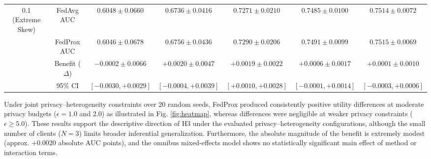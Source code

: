\documentclass[conference]{IEEEtran}
\begin{document}
\begin{table}[t]
\begin{tabular}{ccccccc}
\midrule
0.1 (Extreme Skew)& FedAvg AUC & $0.6048 \pm 0.0660$ & $0.6736 \pm 0.0416$ & $0.7271 \pm 0.0210$ & $0.7485 \pm 0.0100$ & $0.7514 \pm 0.0072$ \\
                & FedProx AUC & $0.6046 \pm 0.0678$ & $0.6756 \pm 0.0436$ & $0.7290 \pm 0.0206$ & $0.7491 \pm 0.0099$ & $0.7515 \pm 0.0069$ \\
                & Benefit ($\Delta$) & $-0.0002 \pm 0.0066$ & $+0.0020 \pm 0.0047$ & $+0.0019 \pm 0.0022$ & $+0.0006 \pm 0.0017$ & $+0.0001 \pm 0.0010$ \\
                & 95\% CI & $[-0.0030, +0.0029]$ & $[-0.0004, +0.0039]$ & $[+0.0010, +0.0028]$ & $[-0.0001, +0.0014]$ & $[-0.0003, +0.0006]$ \\
\bottomrule
\end{tabular}
\label{tab:interaction}
\end{table}

Under joint privacy–heterogeneity constraints over 20 random seeds, FedProx produced consistently positive utility differences at moderate privacy budgets ($\epsilon = 1.0$ and $2.0$) as illustrated in Fig. \ref{fig:heatmap}, whereas differences were negligible at weaker privacy constraints ($\epsilon \ge 5.0$). These results support the descriptive direction of H3 under the evaluated privacy–heterogeneity configurations, although the small number of clients ($N=3$) limits broader inferential generalization. Furthermore, the absolute magnitude of the benefit is extremely modest (approx. $+0.0020$ absolute AUC points), and the omnibus mixed-effects model shows no statistically significant main effect of method or interaction terms.
\end{document}
